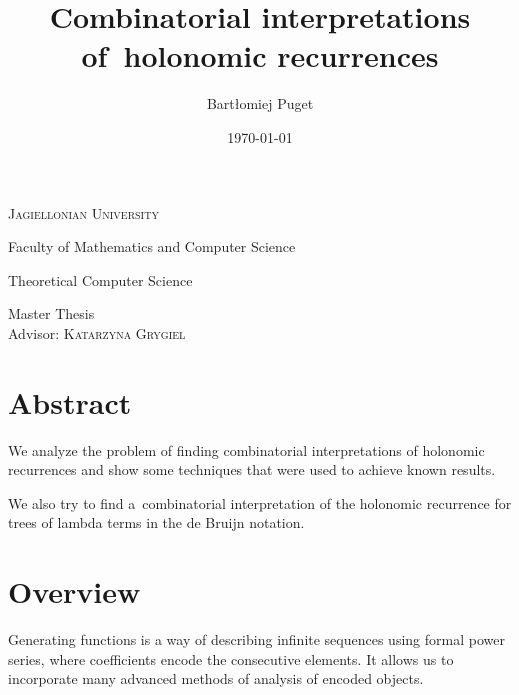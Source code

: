 \documentclass[final]{article}
\title{Combinatorial interpretations of~holonomic recurrences}
\author{Bartłomiej Puget}
\date{\today}
\theoremstyle{definition}
\theoremstyle{definition}
\theoremstyle{remark}
\begin{document}
\begin{titlepage}
	\begin{center}
	\textsc{\LARGE Jagiellonian University}

	\Large Faculty of Mathematics and Computer Science

	\Large Theoretical Computer Science

	\vfill

	\vspace{1cm}
	\hrulefill
	\vspace{0.5cm}

    \makeatletter
    \huge \textsc{\@title}
    \makeatother

	\vspace{0.2cm}
	\hrulefill

	\vspace{1cm}
    \makeatletter
	\textsc{\Large \@author}
    \makeatother

	\vspace{1cm}
    \normalsize

	Master Thesis\\
	Advisor: \textsc{Katarzyna Grygiel}

	\vfill

    \makeatletter
    \@date
    \makeatother
	\end{center}
\end{titlepage}

\section*{Abstract}%
\label{sec:abstract}

We analyze the problem of finding combinatorial interpretations of holonomic recurrences and show some techniques that were used to achieve known results.

We also try to find a~combinatorial interpretation of the holonomic recurrence for trees of lambda terms in the de Bruijn notation.

\clearpage

\tableofcontents
\clearpage

\section{Overview}%

Generating functions is a way of describing infinite sequences using formal power series, where coefficients encode the consecutive elements. It allows us to incorporate many advanced methods of analysis of encoded objects.
\end{document}
